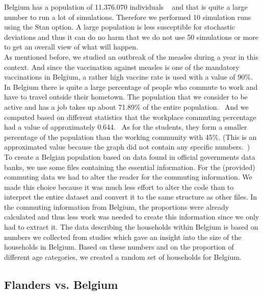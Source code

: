 \documentclass[runningheads]{llncs}
\begin{document}
	Belgium has a population of 11.376.070 individuals ~\cite{8} and that is quite a large number to run a lot of simulations. Therefore we performed 10 simulation runs using the Stan option. A large population is less susceptible for stochastic deviations and thus it can do no harm that we do not use 50 simulations or more to get an overall view of what will happen.\\
	\noindent
	As mentioned before, we studied an outbreak of the measles during a year in this context. And since the vaccination against measles is one of the mandatory vaccinations in Belgium, a rather high vaccine rate is used with a value of 90\%. ~\cite{9} In Belgium there is quite a large percentage of people who commute to work and have to travel outside their hometown. The population that we consider to be active and has a job takes up about 71.89\% of the entire population.~\cite{14} And we computed based on different statistics that the workplace commuting percentage had a value of approximately 0.644.~\cite{12} As for the students, they form a smaller percentage of the population than the working community with 45\%. (This is an approximated value because the graph did not contain any specific numbers.~\cite{15})\\
	\noindent
	To create a Belgian population based on data found in official governments data banks, we use some files containing the essential information. For the (provided) commuting data we had to alter the reader for the commuting information. We made this choice because it was much less effort to alter the code than to interpret the entire dataset and convert it to the same structure as other files. In the commuting information from Belgium, the proportions were already calculated and thus less work was needed to create this information since we only had to extract it. The data describing the households within Belgium is based on numbers we collected from studies which gave an insight into the size of the households in Belgium. Based on these numbers and on the proportion of different age categories, we created a random set of households for Belgium.~\cite{10} ~\cite{11}
	
	\subsection{Flanders vs. Belgium}
	
\end{document}
